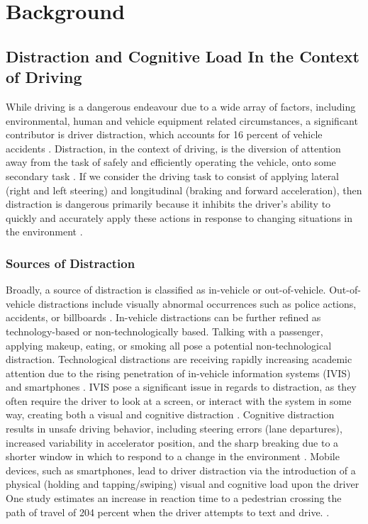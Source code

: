 \chapter{Background} \label{CH:background}

\section{Distraction and Cognitive Load In the Context of Driving}\label{Sect:distraction}

While driving is a dangerous endeavour due to a wide array of factors, including environmental, human and vehicle equipment related circumstances, a significant contributor is driver distraction, which accounts for 16 percent of vehicle accidents \cite{distracted_nhtsa_17}. Distraction, in the context of driving, is the diversion of attention away from the task of safely and efficiently operating the vehicle, onto some secondary task \cite{regan2011driver}. If we consider the driving task to consist of applying lateral (right and left steering) and longitudinal (braking and forward acceleration), then distraction is dangerous primarily because it inhibits the driver's ability to quickly and accurately apply these actions in response to changing situations in the environment \cite{pettitt2005defining}.

\subsection{Sources of Distraction}
Broadly, a source of distraction is classified as in-vehicle or out-of-vehicle. Out-of-vehicle distractions include visually abnormal occurrences such as police actions, accidents, or billboards \cite{edquist2011effects}. In-vehicle distractions can be further refined as technology-based or non-technologically based. Talking with a passenger, applying makeup, eating, or smoking all pose a potential non-technological distraction. Technological distractions are receiving rapidly increasing academic attention due to the rising penetration of in-vehicle information systems (IVIS) and smartphones \cite{bayly200812}. IVIS pose a significant issue in regards to distraction, as they often require the driver to look at a screen, or interact with the system in some way, creating both a visual and cognitive distraction \cite{birrell2011impact}. Cognitive distraction results in unsafe driving behavior, including steering errors (lane departures), increased variability in accelerator position, and the sharp breaking due to a shorter window in which to respond to a change in the environment \cite{reyes_influence_2004}. Mobile devices, such as smartphones, lead to driver distraction via the introduction of a physical (holding and tapping/swiping) visual and cognitive load upon the driver One study estimates an increase in reaction time to a pedestrian crossing the path of travel of 204 percent when the driver attempts to text and drive. \cite{CHOUDHARY2017351}.

